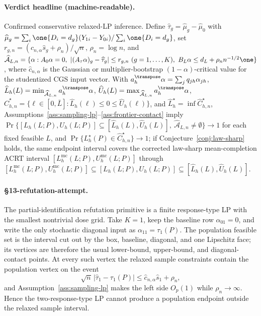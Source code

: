 \begin{theorem}
\paragraph{Verdict headline (machine-readable).}
Confirmed conservative relaxed-LP inference. Define \(\widehat\tau_g=\widehat\mu_g-\widehat\mu_0\) with \(\widehat\mu_g=\sum_i\one\{D_i=d_g\}(Y_{1i}-Y_{0i})/\sum_i\one\{D_i=d_g\}\), set \(r_{g,n}=(\widehat c_{n,\alpha}\widehat s_g+\rho_n)/\sqrt n\), \(\rho_n=\log n\), and \(\widehat{\mathcal A}_{L,n}=\{\alpha:A_0\alpha=0,\ |(A_\tau\alpha)_g-\widehat\tau_g|\le r_{g,n}\ (g=1,\ldots,K),\ B_L\alpha\le d_L+\rho_n n^{-1/2}\one\}\), where \(\widehat c_{n,\alpha}\) is the Gaussian or multiplier-bootstrap \((1-\alpha)\)-critical value for the studentized CGS input vector. With \(a_h^\transpose\alpha=\sum_jq_{jh}\alpha_{jh}\), \(\widehat L_h(L)=\min_{\widehat{\mathcal A}_{L,n}}a_h^\transpose\alpha\), \(\widehat U_h(L)=\max_{\widehat{\mathcal A}_{L,n}}a_h^\transpose\alpha\), \(\widehat C_{h,n}^\star=\{\ell\in[0,\bar L]:\widehat L_h(\ell)\le0\le\widehat U_h(\ell)\}\), and \(\widehat L_h^\star=\inf\widehat C_{h,n}^\star\), Assumptions~\ref{ass:sampling-lp}--\ref{ass:frontier-contact} imply \(\Pr\{[L_h(L;P),U_h(L;P)]\subseteq[\widehat L_h(L),\widehat U_h(L)],\ \widehat{\mathcal A}_{L,n}\ne\emptyset\}\to1\) for each fixed feasible \(L\), and \(\Pr\{L_h^\star(P)\in\widehat C_{h,n}^\star\}\to1\); if Conjecture~\ref{conj:law-sharp} holds, the same endpoint interval covers the corrected law-sharp mean-completion ACRT interval \([L_h^{\mathrm{mc}}(L;P),U_h^{\mathrm{mc}}(L;P)]\) through \([L_h^{\mathrm{mc}}(L;P),U_h^{\mathrm{mc}}(L;P)]\subseteq[L_h(L;P),U_h(L;P)]\subseteq[\widehat L_h(L),\widehat U_h(L)]\).
\end{theorem}

\paragraph{\S13-refutation-attempt.}
The partial-identification refutation primitive is a finite response-type LP
with the smallest nontrivial dose grid.  Take \(K=1\), keep the baseline row
\(\alpha_{01}=0\), and write the only stochastic diagonal input as
\(\alpha_{11}=\tau_1(P)\).  The population feasible set is the interval
cut out by the box, baseline, diagonal, and one Lipschitz face; its vertices
are therefore the usual lower-bound, upper-bound, and diagonal-contact
points.  At every such vertex the relaxed sample constraints contain the
population vertex on the event
\[
  \sqrt n\,|\widehat\tau_1-\tau_1(P)|
  \le \widehat c_{n,\alpha}\widehat s_1+\rho_n,
\]
and Assumption~\ref{ass:sampling-lp} makes the left side \(O_p(1)\) while
\(\rho_n\to\infty\).  Hence the two-response-type LP cannot produce a
population endpoint outside the relaxed sample interval.

